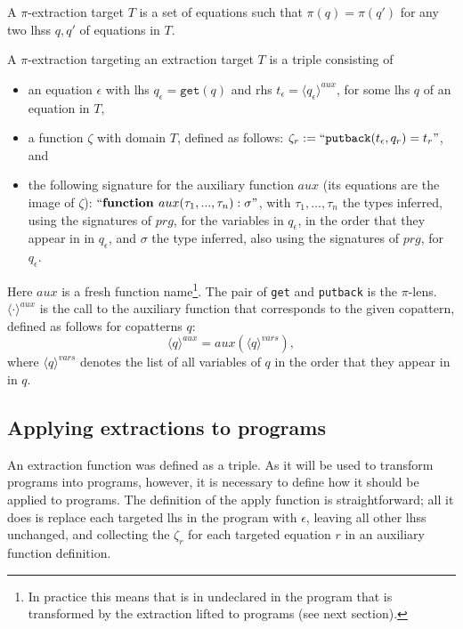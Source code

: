 \begin{definition}
A $\pi$-extraction target $T$ is a set of equations such that $\pi(q) = \pi(q')$ for any two lhss $q, q'$ of equations in $T$.
\end{definition}

\begin{definition}
A $\pi$-extraction targeting an extraction target $T$ is a triple consisting of
\begin{itemize}
\item an equation $\epsilon$ with lhs $q_\epsilon = \mathtt{get}(q)$ and rhs $t_\epsilon = \langle q_\epsilon \rangle^{aux}$, for some lhs $q$ of an equation in $T$,
\item a function $\zeta$ with domain $T$, defined as follows: $\zeta_r := ``\mathtt{putback}(t_\epsilon, q_r) = t_r  "$, and
\item the following signature for the auxiliary function $aux$ (its equations are the image of $\zeta$): $`` \textrm{\textbf{function }} aux(\tau_1, ..., \tau_n): \sigma "$, with $\tau_1, ..., \tau_n$ the types inferred, using the signatures of $prg$, for the variables in $q_\epsilon$, in the order that they appear in in $q_\epsilon$, and $\sigma$ the type inferred, also using the signatures of $prg$, for $q_\epsilon$.
\end{itemize}

Here $aux$ is a fresh function name\footnote{In practice this means that is in undeclared in the program that is transformed by the extraction lifted to programs (see next section).}. The pair of \texttt{get} and \texttt{putback} is the $\pi$-lens. $\langle \cdot \rangle^{aux}$ is the call to the auxiliary function that corresponds to the given copattern, defined as follows for copatterns $q$:
\[
\langle q \rangle^{aux} = aux(\langle q \rangle^{vars}),
\]
where $\langle q \rangle^{vars}$ denotes the list of all variables of $q$ in the order that they appear in in $q$.
\end{definition}

\subsection{Applying extractions to programs}

An extraction function was defined as a triple. As it will be used to transform programs into programs, however, it is necessary to define how it should be applied to programs. The definition of the apply function is straightforward; all it does is replace each targeted lhs in the program with $\epsilon$, leaving all other lhss unchanged, and collecting the $\zeta_r$ for each targeted equation $r$ in an auxiliary function definition.

